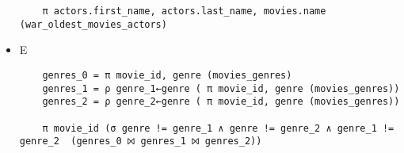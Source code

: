 \documentclass[11pt]{article}
\begin{document}
\begin{itemize}
\begin{verbatim}
	π actors.first_name, actors.last_name, movies.name (war_oldest_movies_actors)
	\end{verbatim}
	\item E
	\begin{verbatim}
	genres_0 = π movie_id, genre (movies_genres)
	genres_1 = ρ genre_1←genre ( π movie_id, genre (movies_genres))
	genres_2 = ρ genre_2←genre ( π movie_id, genre (movies_genres))

	π movie_id (σ genre != genre_1 ∧ genre != genre_2 ∧ genre_1 != genre_2  (genres_0 ⨝ genres_1 ⨝ genres_2))
	\end{verbatim}

\end{itemize}
\end{document}
